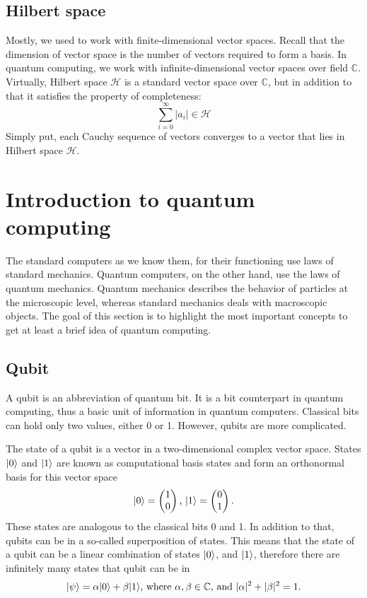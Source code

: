 \subsection{Hilbert space}
Mostly, we used to work with finite-dimensional vector spaces. Recall that the dimension of vector space is the number of vectors required to form a basis. In quantum computing, we work with infinite-dimensional vector spaces over field $\mathbb{C}$. Virtually, Hilbert space $\mathcal{H}$ is a standard vector space over $\mathbb{C}$, but in addition to that it satisfies the property of completeness:
\begin{equation}
  \sum_{i=0}^{\infty}\vert a_i \vert \in \mathcal{H}
\end{equation}
Simply put, each Cauchy sequence of vectors converges to a vector that lies in Hilbert space $\mathcal{H}$.

\section{Introduction to quantum computing}
The standard computers as we know them, for their functioning use laws of standard mechanics. Quantum computers, on the other hand, use the laws of quantum mechanics. Quantum mechanics describes the behavior of particles at the microscopic level, whereas standard mechanics deals with macroscopic objects. The goal of this section is to highlight the most important concepts to get at least a brief idea of quantum computing.
\subsection{Qubit}
A qubit is an abbreviation of quantum bit. It is a bit counterpart in quantum computing, thus a basic unit of information in quantum computers. Classical bits can hold only two values, either 0 or 1. However, qubits are more complicated.

The state of a qubit is a vector in a two-dimensional complex vector space. States $\lvert0\rangle$ and $\lvert1\rangle$ are known as computational basis states and form an orthonormal basis for this vector space~\cite{qc} 
$$\lvert0\rangle = \begin{pmatrix} 1 \\ 0 \end{pmatrix}\text{, }\lvert1\rangle = \begin{pmatrix} 0 \\ 1 \end{pmatrix}\text{.}$$
These states are analogous to the classical bits 0 and 1. In addition to that, qubits can be in a so-called superposition of states. This means that the state of a qubit can be a linear combination of states $\lvert0\rangle$, and $\lvert1\rangle$, therefore there are infinitely many states that qubit can be in $$\lvert\psi\rangle = \alpha \lvert0\rangle + 
\beta \lvert1\rangle\text{, where } \alpha,\beta \in \mathbb{C}\text{, and } \lvert \alpha \rvert^2 + \lvert \beta \rvert^2 = 1\text{.}$$

